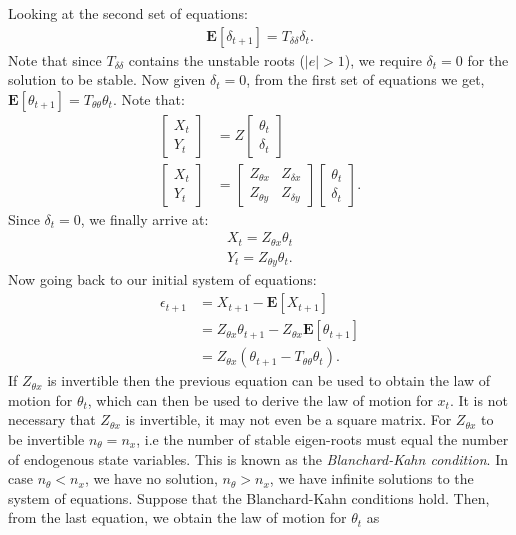 \documentclass[12pt]{article}
\begin{document}
Looking at the second set of equations:
\begin{align*}
\mathbf{E}[\delta_{t+1}] = T_{\delta\delta} \delta_t.
\end{align*}
Note that since $T_{\delta\delta}$ contains the unstable roots ($|e| > 1$), we require $\delta_t = 0$ for the solution to be stable. Now given $\delta_t = 0$, from the first set of equations we get, $\mathbf{E}[\theta_{t+1}] = T_{\theta\theta} \theta_t$. Note that:
\begin{align*}
\begin{bmatrix} X_t \\ Y_t \end{bmatrix} & = Z \begin{bmatrix} \theta_t \\ \delta_t \end{bmatrix} \\
\begin{bmatrix} X_t \\ Y_t \end{bmatrix} & = \begin{bmatrix} Z_{\theta x} & Z_{\delta x} \\ Z_{\theta y} & Z_{\delta y} \end{bmatrix} \begin{bmatrix} \theta_t \\ \delta_t \end{bmatrix}.
\end{align*}
Since $\delta_t =0$, we finally arrive at:
\begin{align*}
X_t = Z_{\theta x} \theta_t \\
Y_t = Z_{\theta y} \theta_t.
\end{align*}
Now going back to our initial system of equations:
\begin{align*}
\epsilon_{t+1} & = X_{t+1} - \mathbf{E}[X_{t+1}] \\
& = Z_{\theta x} \theta_{t+1} - Z_{\theta x} \mathbf{E}[\theta_{t+1}] \\
& = Z_{\theta x} (\theta_{t+1} - T_{\theta \theta} \theta_t).  
\end{align*}
If $Z_{\theta x}$ is invertible then the previous equation can be used to obtain the law of motion for $\theta_t$, which can then be used to derive the law of motion for $x_t$. It is not necessary that $Z_{\theta x}$ is invertible, it may not even be a square matrix. For $Z_{\theta x}$ to be invertible $n_{\theta} = n_{x}$, i.e the number of stable eigen-roots must equal the number of endogenous state variables. This is known as the \textit{Blanchard-Kahn condition}. In case $n_{\theta} < n_{x}$, we have no solution, $n_{\theta} > n_{x}$, we have infinite solutions to the system of equations. Suppose that the Blanchard-Kahn conditions hold. Then, from the last equation, we obtain the law of motion for $\theta_t$ as
\end{document}
